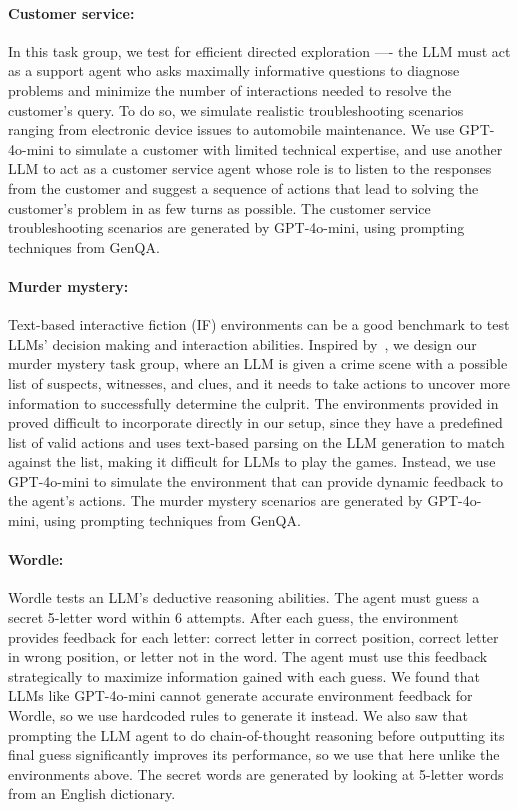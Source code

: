 \paragraph{Customer service: } In this task group, we test for efficient directed exploration ---- the LLM must act as a support agent who asks maximally informative questions to diagnose problems and minimize the number of interactions needed to resolve the customer's query. To do so, we simulate realistic troubleshooting scenarios ranging from electronic device issues to automobile maintenance. We use GPT-4o-mini to simulate a customer with limited technical expertise, and use another LLM to act as a customer service agent whose role is to listen to the responses from the customer and suggest a sequence of actions that lead to solving the customer's problem in as few turns as possible. The customer service troubleshooting scenarios are generated by GPT-4o-mini, using prompting techniques from GenQA.

\paragraph{Murder mystery: } Text-based interactive fiction (IF) environments can be a good benchmark to test LLMs' decision making and interaction abilities. Inspired by~\citet{hausknecht2020interactivefictionenvironmentscolossal}, we design our murder mystery task group, where an LLM is given a crime scene with a possible list of suspects, witnesses, and clues, and it needs to take actions to uncover more information to successfully determine the culprit.  The environments provided in ~\citet{hausknecht2020interactivefictionenvironmentscolossal} proved difficult to incorporate directly in our setup, since they have a predefined list of valid actions and uses text-based parsing on the LLM generation to match against the list, making it difficult for LLMs to play the games. Instead, we use GPT-4o-mini to simulate the environment that can provide dynamic feedback to the agent's actions. The murder mystery scenarios are generated by GPT-4o-mini, using prompting techniques from GenQA.

\paragraph{Wordle: } Wordle tests an LLM's deductive reasoning abilities. The agent must guess a secret 5-letter word within 6 attempts. After each guess, the environment provides feedback for each letter: correct letter in correct position, correct letter in wrong position, or letter not in the word.
The agent must use this feedback strategically to maximize information gained with each guess. We found that LLMs like GPT-4o-mini cannot generate accurate environment feedback for Wordle, so we use hardcoded rules to generate it instead. We also saw that prompting the LLM agent to do chain-of-thought reasoning before outputting its final guess significantly improves its performance, so we use that here unlike the environments above. The secret words are generated by looking at 5-letter words from an English dictionary.

